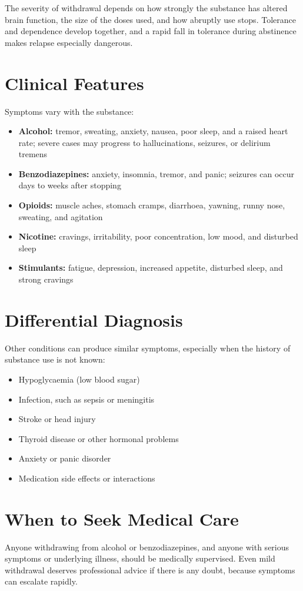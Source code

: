 The severity of withdrawal depends on how strongly the substance has altered brain function, the size of the doses used, and how abruptly use stops. Tolerance and dependence develop together, and a rapid fall in tolerance during abstinence makes relapse especially dangerous.

\section*{Clinical Features}
Symptoms vary with the substance:

\begin{itemize}
    \item \textbf{Alcohol:} tremor, sweating, anxiety, nausea, poor sleep, and a raised heart rate; severe cases may progress to hallucinations, seizures, or delirium tremens
    \item \textbf{Benzodiazepines:} anxiety, insomnia, tremor, and panic; seizures can occur days to weeks after stopping
    \item \textbf{Opioids:} muscle aches, stomach cramps, diarrhoea, yawning, runny nose, sweating, and agitation
    \item \textbf{Nicotine:} cravings, irritability, poor concentration, low mood, and disturbed sleep
    \item \textbf{Stimulants:} fatigue, depression, increased appetite, disturbed sleep, and strong cravings
\end{itemize}

\section*{Differential Diagnosis}
Other conditions can produce similar symptoms, especially when the history of substance use is not known:

\begin{itemize}
    \item Hypoglycaemia (low blood sugar)
    \item Infection, such as sepsis or meningitis
    \item Stroke or head injury
    \item Thyroid disease or other hormonal problems
    \item Anxiety or panic disorder
    \item Medication side effects or interactions
\end{itemize}

\section*{When to Seek Medical Care}
Anyone withdrawing from alcohol or benzodiazepines, and anyone with serious symptoms or underlying illness, should be medically supervised. Even mild withdrawal deserves professional advice if there is any doubt, because symptoms can escalate rapidly.

